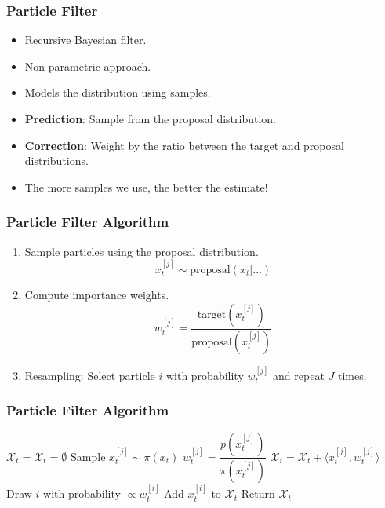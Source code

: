 \begin{frame}
    \frametitle{Particle Filter}
    \begin{itemize}
        \item Recursive Bayesian filter.
        \item Non-parametric approach.
        \item Models the distribution using samples.
        \item \textbf{Prediction}: Sample from the proposal distribution.
        \item \textbf{Correction}: Weight by the ratio between the target and proposal distributions.
        \item \alert{The more samples we use, the better the estimate!}
    \end{itemize}
\end{frame}

\begin{frame}
    \frametitle{Particle Filter Algorithm}
    \begin{enumerate}
        \item Sample particles using the proposal distribution.
        \begin{equation*}
            x_t^{[j]} \sim \text{proposal}(x_t | \ldots)
        \end{equation*}
        \item Compute importance weights.
        \begin{equation*}
            w_t^{[j]} = \frac{\text{target}(x_t^{[j]})}{\text{proposal}(x_t^{[j]})}
        \end{equation*}
        \item Resampling: Select particle $i$ with probability $w_t^{[j]}$ and repeat $J$ times.
    \end{enumerate}
\end{frame}

\begin{frame}
    \frametitle{Particle Filter Algorithm}
    \begin{algorithmic}[1]
        \State $\bar{\mathcal{X}}_t = \mathcal{X}_t = \emptyset$
            \State Sample $x_t^{[j]} \sim \pi(x_t)$
            \State $w_t^{[j]} = \dfrac{p(x_t^{[j]})}{\pi(x_{t}^{[j]})}$
            \State $\bar{\mathcal{X}}_t = \bar{\mathcal{X}}_t + \langle x_t^{[j]}, w_t^{[j]}\rangle$
        \EndFor
            \State Draw $i$ with probability $\propto w_t^{[i]}$
            \State Add $x_t^{[i]}$ to $\mathcal{X}_t$
        \EndFor
        \State Return $\mathcal{X}_t$
        \EndProcedure
    \end{algorithmic}
\end{frame}

